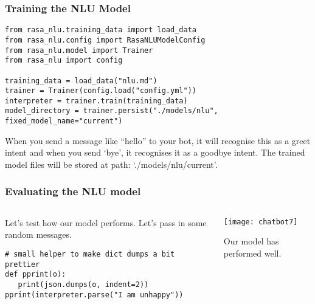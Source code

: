  \begin{frame}[fragile]\frametitle{Training the NLU Model}
\begin{lstlisting}
from rasa_nlu.training_data import load_data
from rasa_nlu.config import RasaNLUModelConfig
from rasa_nlu.model import Trainer
from rasa_nlu import config

training_data = load_data("nlu.md")
trainer = Trainer(config.load("config.yml"))
interpreter = trainer.train(training_data)
model_directory = trainer.persist("./models/nlu", fixed_model_name="current")
\end{lstlisting}

When you send a message like “hello” to your bot, it will recognise this as a greet intent and when you send ‘bye’, it recognises it as a goodbye intent. The trained model files will be stored at path: ‘./models/nlu/current’.

\end{frame}

 \begin{frame}[fragile]\frametitle{Evaluating the NLU model}
 
    \begin{columns}
    \begin{column}[t]{0.5\linewidth}
	 Let's test how our model performs. Let’s pass in some random messages.

\begin{lstlisting}
# small helper to make dict dumps a bit prettier
def pprint(o):
   print(json.dumps(o, indent=2))
pprint(interpreter.parse("I am unhappy"))
\end{lstlisting}
    \end{column}
    \begin{column}[t]{0.5\linewidth}
\begin{center}
\texttt{[image: chatbot7]}
\end{center}

Our model has performed well. 
    \end{column}
  \end{columns}
\end{frame}

